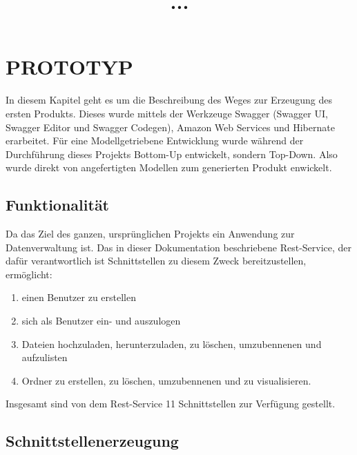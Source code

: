 \documentclass[a4paper,twoside]{article}
\begin{document}
	
	\title{\uppercase{...}}
	
	\author{
	}
	
	
	
	\onecolumn \maketitle \normalsize \vfill
	
	\section{\uppercase{Prototyp}}
	
	In diesem Kapitel geht es um die Beschreibung des Weges zur Erzeugung des ersten Produkts. Dieses wurde mittels der Werkzeuge Swagger \cite{swagger} (Swagger UI, Swagger Editor und Swagger Codegen), Amazon Web Services und Hibernate erarbeitet. F\"ur eine Modellgetriebene Entwicklung wurde w\"ahrend der Durchf\"uhrung dieses Projekts Bottom-Up entwickelt, sondern Top-Down. Also wurde direkt von angefertigten Modellen zum generierten Produkt enwickelt.
	
	\subsection{Funktionalit\"at}
	
	Da das Ziel des ganzen, urspr\"unglichen Projekts ein Anwendung zur Datenverwaltung ist. Das in dieser Dokumentation beschriebene Rest-Service, der daf\"ur verantwortlich ist Schnittstellen zu diesem Zweck bereitzustellen, erm\"oglicht:
	\begin{enumerate}
		\item einen Benutzer zu erstellen
		\item sich als Benutzer ein- und auszulogen
		\item Dateien hochzuladen, herunterzuladen, zu l\"oschen, umzubennenen und aufzulisten
		\item Ordner zu erstellen, zu l\"oschen, umzubennenen und zu visualisieren.
	\end{enumerate}
	
	Insgesamt sind von dem Rest-Service 11 Schnittstellen zur Verf\"ugung gestellt.
	
	\subsection{Schnittstellenerzeugung}
	
\end{document}
